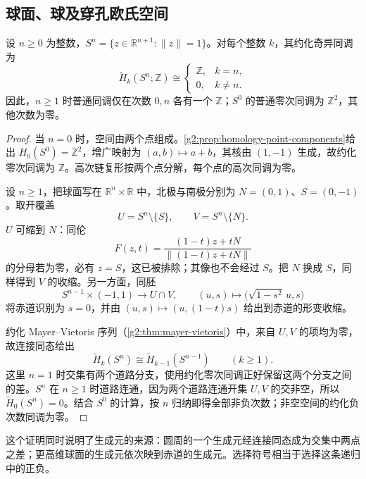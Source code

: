 \subsection{球面、球及穿孔欧氏空间}
\label{g2:subsec:0204:01}
\begin{theorem}\label{g2:thm:sphere-homology}
	设 \(n\ge0\) 为整数，\(S^n=\{z\in\mathbb R^{n+1}:\|z\|=1\}\)。对每个整数 \(k\)，其约化奇异同调为
	\[
		\widetilde H_k(S^n;\mathbb Z)\cong
		\begin{cases}\mathbb Z,&k=n,\\0,&k\ne n.\end{cases}
	\]
	因此，\(n\ge1\) 时普通同调仅在次数 \(0,n\) 各有一个 \(\mathbb Z\)；\(S^0\) 的普通零次同调为 \(\mathbb Z^2\)，其他次数为零。
\end{theorem}
\begin{proof}
	当 \(n=0\) 时，空间由两个点组成。\cref{g2:prop:homology-point-components}给出 \(H_0(S^0)=\mathbb Z^2\)，增广映射为 \((a,b)\mapsto a+b\)，其核由 \((1,-1)\) 生成，故约化零次同调为 \(\mathbb Z\)。高次链复形按两个点分解，每个点的高次同调为零。

	设 \(n\ge1\)，把球面写在 \(\mathbb R^n\times\mathbb R\) 中，北极与南极分别为 \(N=(0,1)\)、\(S=(0,-1)\)。取开覆盖
	\[
		U=S^n\setminus\{S\},\qquad V=S^n\setminus\{N\}.
	\]
	\(U\) 可缩到 \(N\)：同伦
	\[
		F(z,t)=\frac{(1-t)z+tN}{\|(1-t)z+tN\|}
	\]
	的分母若为零，必有 \(z=S\)，这已被排除；其像也不会经过 \(S\)。把 \(N\) 换成 \(S\)，同样得到 \(V\) 的收缩。另一方面，同胚
	\[
		S^{n-1}\times(-1,1)\longrightarrow U\cap V,\qquad
		(u,s)\longmapsto\bigl(\sqrt{1-s^2}\,u,s\bigr)
	\]
	将赤道识别为 \(s=0\)，并由 \((u,s)\mapsto(u,(1-t)s)\) 给出到赤道的形变收缩。

	约化 Mayer–Vietoris 序列（\cref{g2:thm:mayer-vietoris}）中，来自 \(U,V\) 的项均为零，故连接同态给出
	\[
		\widetilde H_k(S^n)\cong\widetilde H_{k-1}(S^{n-1})
		\qquad(k\ge1).
	\]
	这里 \(n=1\) 时交集有两个道路分支，使用约化零次同调正好保留这两个分支之间的差。\(S^n\) 在 \(n\ge1\) 时道路连通，因为两个道路连通开集 \(U,V\) 的交非空，所以 \(\widetilde H_0(S^n)=0\)。结合 \(S^0\) 的计算，按 \(n\) 归纳即得全部非负次数；非空空间的约化负次数同调为零。
\end{proof}

这个证明同时说明了生成元的来源：圆周的一个生成元经连接同态成为交集中两点之差；更高维球面的生成元依次映到赤道的生成元。选择符号相当于选择这条递归中的正负。

